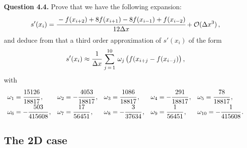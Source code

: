 \documentclass[10pt]{article}
\begin{document}
\begin{leftbar}
\textbf{Question 4.4.} Prove that we have the following expansion:
\begin{equation}
s'(x_{i}) = \cfrac{-f(x_{i+2})+8 f(x_{i+1})- 8 f(x_{i-1}) + f(x_{i-2})}{12\Delta x} + \mathcal{O}(\Delta x^{3})\, ,
\end{equation}
and deduce from that a third order approximation of $s'(x_{i})$ of the form
\begin{equation}
s'(x_{i}) \approx \cfrac{1}{\Delta x}\, \sum_{j\,=\,1}^{10} \, \omega_{j}\,\big(f(x_{i+j}-f(x_{i-j})\big) \, ,
\end{equation}
with
\begin{equation}
\begin{array}{lllll}
\omega_{1} = \cfrac{15126}{18817} \, , & \omega_{2} = -\cfrac{4053}{18817} \, , & \omega_{3} = \cfrac{1086}{18817} \, , & \omega_{4} = -\cfrac{291}{18817} \, , & \omega_{5} = \cfrac{78}{18817} \, , \\
\omega_{6} = -\cfrac{503}{415608} \, , & \omega_{7} = \cfrac{17}{56451} \, , & \omega_{8} = -\cfrac{3}{37634} \, , & \omega_{9} = \cfrac{1}{56451} \, , & \omega_{10} = -\cfrac{1}{415608} \, .
\end{array}
\end{equation}
\end{leftbar}


\subsection{The 2D case}
\end{document}
